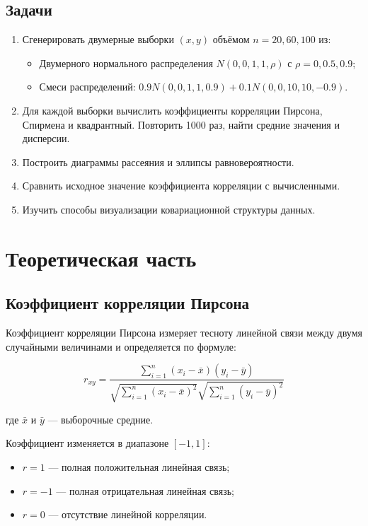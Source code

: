 \documentclass[12pt, a4paper]{article}
\begin{document}
\subsection{Задачи}
\begin{enumerate}
    \item Сгенерировать двумерные выборки $(x, y)$ объёмом $n = 20, 60, 100$ из:
    \begin{itemize}
        \item Двумерного нормального распределения $N(0, 0, 1, 1, \rho)$ с $\rho = 0, 0.5, 0.9$;
        \item Смеси распределений: $0.9N(0, 0, 1, 1, 0.9) + 0.1N(0, 0, 10, 10, -0.9)$.
    \end{itemize}
    \item Для каждой выборки вычислить коэффициенты корреляции Пирсона, Спирмена и квадрантный. Повторить 1000 раз, найти средние значения и дисперсии.
    \item Построить диаграммы рассеяния и эллипсы равновероятности.
    \item Сравнить исходное значение коэффициента корреляции с вычисленными.
    \item Изучить способы визуализации ковариационной структуры данных.
\end{enumerate}

\section{Теоретическая часть}

\subsection{Коэффициент корреляции Пирсона}

Коэффициент корреляции Пирсона измеряет тесноту линейной связи между двумя случайными величинами и определяется по формуле:

\begin{equation}
r_{xy} = \frac{\sum\limits_{i=1}^{n}(x_i - \bar{x})(y_i - \bar{y})}{\sqrt{\sum\limits_{i=1}^{n}(x_i - \bar{x})^2}\sqrt{\sum\limits_{i=1}^{n}(y_i - \bar{y})^2}}
\end{equation}

где $\bar{x}$ и $\bar{y}$ — выборочные средние.

Коэффициент изменяется в диапазоне $[-1, 1]$:
\begin{itemize}
    \item $r = 1$ — полная положительная линейная связь;
    \item $r = -1$ — полная отрицательная линейная связь;
    \item $r = 0$ — отсутствие линейной корреляции.
\end{itemize}
\end{document}
